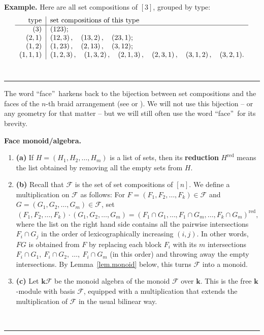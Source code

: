 \documentclass[12pt]{article}
\theoremstyle{definition}%
\theoremstyle{definition}%
\newtheorem{defn}[thm]{Definition}
\newtheorem{exmp}[thm]{Example}
\theoremstyle{remark}%
\newcommand{\tup}[1]{\left( #1 \right)}
\newcommand{\interval}[1]{\left[ #1 \right]} %
\newcommand{\kk}{\mathbf{k}}
\newcommand{\kf}{\kk\mathcal{F}}
\newcommand{\CF}{\mathcal{F}}
\newcommand{\red}{\operatorname{red}}
\newcommand{\defin}[1]{\textbf{#1}}
\newenvironment{defn}[1][Definition]{\noindent\textbf{#1.} }{\ \rule{0.5em}{0.5em}}
\newenvironment{exmp}[1][Example]{\noindent\textbf{#1.} }{\ \rule{0.5em}{0.5em}}
\begin{document}
\begin{exmp}
    \label{exa.F3type}
    Here are all set compositions of $\interval{3}$, grouped by type:
    \begin{align*}
        \begin{tabular}{r|l}
        \text{type} & \text{set compositions of this type} \\ \hline
        $\tup{3}$ & $\tup{ 123 }$; \\
        $\tup{2,1}$ & $\tup{ 12,3 }, \quad \tup{ 13,2 }, \quad \tup{ 23,1 }$; \\
        $\tup{1,2}$ & $\tup{ 1,23 }, \quad \tup{ 2,13 }, \quad \tup{ 3,12 } $; \\
        $\tup{1,1,1}$ & $\tup{ 1,2,3 }, \quad \tup{ 1,3,2 }, \quad \tup{ 2,1,3 }, \quad \tup{ 2,3,1 }, \quad \tup{ 3,1,2 }, \quad \tup{ 3,2,1 }$.
        \end{tabular}
    \end{align*}
\end{exmp}

The word ``face''\ harkens back to the bijection between set compositions and the faces of the $n$-th braid arrangement (see \cite[\S 4.1.4]{Bidigare-thesis} or \cite[\S 1.2.1]{Saliola}).
We will not use this bijection -- or any geometry for that matter -- but we will still often use the word ``face''\ for its brevity.

\begin{defn}[Face monoid/algebra]
    \label{def.facemon}\ %
    \begin{enumerate}[]
        \item\textbf{(a)} If $H = \tup{H_1,H_2,\ldots,H_m}$ is a list of sets, then its \defin{reduction} $H^{\red}$ means the list obtained by removing all the empty sets from $H$.
        \item\textbf{(b)} Recall that $\CF$ is the set of set compositions of $\interval{n}$. We define a multiplication on $\CF$ as follows:
		For $F=\tup{F_{1},F_{2},\dots,F_k} \in \CF$ and $G=\tup{G_{1},G_{2},\dots,G_{m}} \in \CF$, set
         \[
         \tup{F_1, F_2, \dots, F_k} \cdot \tup{G_1, G_2, \dots, G_m}
		 = \tup{F_1 \cap G_1, \dots, F_1 \cap G_m, \dots, F_k \cap G_m}^{\red},
         \]
        where the list on the right hand side contains all the pairwise intersections $F_i \cap G_j$ in the order of lexicographically increasing $\tup{i,j}$.
		In other words, $FG$ is obtained from $F$ by replacing each block $F_i$ with its $m$ intersections $F_i \cap G_1, \ F_i \cap G_2, \ \ldots, \ F_i \cap G_m$ (in this order) and throwing away the empty intersections.
        By Lemma~\ref{lem.monoid} below, this turns $\CF$ into a monoid.
        \item\textbf{(c)} %
        Let $\kf$ be the monoid algebra of the monoid $\CF$ over $\kk$. This is the free $\kk$-module with basis $\CF$, equipped with a multiplication that extends the multiplication of $\CF$ %
		in the usual bilinear way.
   \end{enumerate}
\end{defn}
\end{document}

